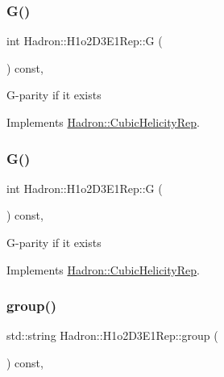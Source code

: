 \subsubsection{\texorpdfstring{G()}{G()}\hspace{0.1cm}{\footnotesize\ttfamily [1/2]}}
{\footnotesize\ttfamily int Hadron\+::\+H1o2\+D3\+E1\+Rep\+::G (\begin{DoxyParamCaption}{ }\end{DoxyParamCaption}) const\hspace{0.3cm}{\ttfamily [inline]}, {\ttfamily [virtual]}}

G-\/parity if it exists 

Implements \mbox{\hyperlink{structHadron_1_1CubicHelicityRep_a50689f42be1e6170aa8cf6ad0597018b}{Hadron\+::\+Cubic\+Helicity\+Rep}}.

\mbox{\label{structHadron_1_1H1o2D3E1Rep_a64320464ed31b286a27f7604c1ccf745}} 
\subsubsection{\texorpdfstring{G()}{G()}\hspace{0.1cm}{\footnotesize\ttfamily [2/2]}}
{\footnotesize\ttfamily int Hadron\+::\+H1o2\+D3\+E1\+Rep\+::G (\begin{DoxyParamCaption}{ }\end{DoxyParamCaption}) const\hspace{0.3cm}{\ttfamily [inline]}, {\ttfamily [virtual]}}

G-\/parity if it exists 

Implements \mbox{\hyperlink{structHadron_1_1CubicHelicityRep_a50689f42be1e6170aa8cf6ad0597018b}{Hadron\+::\+Cubic\+Helicity\+Rep}}.

\mbox{\label{structHadron_1_1H1o2D3E1Rep_a6c9218517ca2797e0d5ee7e92887a916}} 
\subsubsection{\texorpdfstring{group()}{group()}\hspace{0.1cm}{\footnotesize\ttfamily [1/3]}}
{\footnotesize\ttfamily std\+::string Hadron\+::\+H1o2\+D3\+E1\+Rep\+::group (\begin{DoxyParamCaption}{ }\end{DoxyParamCaption}) const\hspace{0.3cm}{\ttfamily [inline]}, {\ttfamily [virtual]}}

